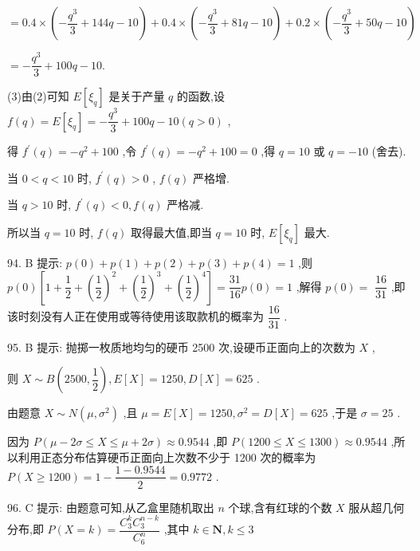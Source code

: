 $= {0.4} \times  \left( {-\dfrac{{q}^{3}}{3} + {144q} - {10}}\right)  + {0.4} \times  \left( {-\dfrac{{q}^{3}}{3} + {81q} - {10}}\right)  + {0.2} \times  \left( {-\dfrac{{q}^{3}}{3} + {50q} - {10}}\right)$

$=  - \dfrac{{q}^{3}}{3} + {100q} - {10}.$

(3)由(2)可知 $E\left\lbrack  {\xi }_{q}\right\rbrack$ 是关于产量 $q$ 的函数,设 $f\left( q\right)  = E\left\lbrack  {\xi }_{q}\right\rbrack   =  - \dfrac{{q}^{3}}{3} + {100q} - {10}\left( {q > 0}\right)$ ,

得 ${f}^{\prime }\left( q\right)  =  - {q}^{2} + {100}$ ,令 ${f}^{\prime }\left( q\right)  =  - {q}^{2} + {100} = 0$ ,得 $q = {10}$ 或 $q =  - {10}$ (舍去).

当 $0 < q < {10}$ 时, ${f}^{\prime }\left( q\right)  > 0$ , $f\left( q\right)$ 严格增.

当 $q > {10}$ 时, ${f}^{\prime }\left( q\right)  < 0,f\left( q\right)$ 严格减.

所以当 $q = {10}$ 时, $f\left( q\right)$ 取得最大值,即当 $q = {10}$ 时, $E\left\lbrack  {\xi }_{q}\right\rbrack$ 最大.

94. B 提示: $p\left( 0\right)  + p\left( 1\right)  + p\left( 2\right)  + p\left( 3\right)  + p\left( 4\right)  = 1$ ,则 $p\left( 0\right) \left\lbrack  {1 + \dfrac{1}{2} + {\left( \dfrac{1}{2}\right) }^{2} + {\left( \dfrac{1}{2}\right) }^{3} + {\left( \dfrac{1}{2}\right) }^{4}}\right\rbrack   = \dfrac{31}{16}p\left( 0\right)  = 1$ ,解得 $p\left( 0\right)  =$  $\dfrac{16}{31}$ ,即该时刻没有人正在使用或等待使用该取款机的概率为 $\dfrac{16}{31}$ .

95. B 提示: 抛掷一枚质地均匀的硬币 2500 次,设硬币正面向上的次数为 $X$ ,

则 $X \sim  B\left( {{2500},\dfrac{1}{2}}\right) ,E\left\lbrack  X\right\rbrack   = {1250},D\left\lbrack  X\right\rbrack   = {625}$ .

由题意 $X \sim  N\left( {\mu ,{\sigma }^{2}}\right)$ ,且 $\mu  = E\left\lbrack  X\right\rbrack   = {1250},{\sigma }^{2} = D\left\lbrack  X\right\rbrack   = {625}$ ,于是 $\sigma  = {25}$ .

因为 $P\left( {\mu  - {2\sigma } \leq  X \leq  \mu  + {2\sigma }}\right)  \approx  {0.9544}$ ,即 $P\left( {{1200} \leq  X \leq  {1300}}\right)  \approx  {0.9544}$ ,所以利用正态分布估算硬币正面向上次数不少于 1200 次的概率为 $P\left( {X \geq  {1200}}\right)  = 1 - \dfrac{1 - {0.9544}}{2} = {0.9772}$ .

96. C 提示: 由题意可知,从乙盒里随机取出 $n$ 个球,含有红球的个数 $X$ 服从超几何分布,即 $P\left( {X = k}\right)  = \dfrac{{C}_{3}^{k}{C}_{3}^{n - k}}{{C}_{6}^{n}}$ ,其中 $k \in  \mathbf{N},k \leq  3$

